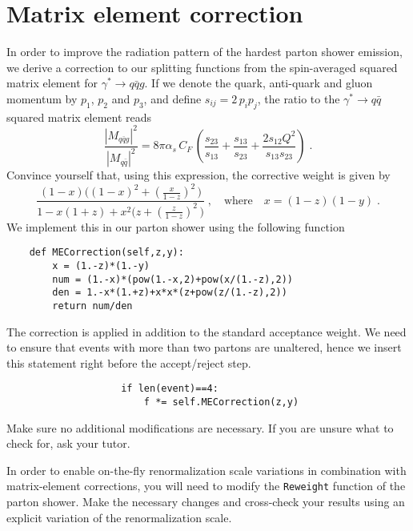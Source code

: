\documentclass[10pt,fleqn]{scrartcl}
\begin{document}
\section{Matrix element correction}
In order to improve the radiation pattern of the hardest parton shower emission,
we derive a correction to our splitting functions from the spin-averaged squared
matrix element for $\gamma^*\to q\bar{q}g$. If we denote the quark, anti-quark
and gluon momentum by $p_1$, $p_2$ and $p_3$, and define $s_{ij}=2\,p_ip_j$,
the ratio to the $\gamma^*\to q\bar{q}$ squared matrix element reads
\begin{equation}\label{eq:ee3jme}
  \frac{|M_{q\bar{q}g}|^2}{|M_{q\bar{q}}|^2}=
  8\pi\alpha_s\,C_F\,\left(\frac{s_{23}}{s_{13}}+\frac{s_{13}}{s_{23}}
  +\frac{2s_{12}Q^2}{s_{13}s_{23}}\right)\;.
\end{equation} 
Convince yourself that, using this expression, the corrective weight is given by
\begin{equation}
  \frac{(1-x)\Bigg((1-x)^2+\left(\displaystyle\frac{x}{1-z}\right)^2\,\Bigg)}{
    1-x(1+z)+x^2\Bigg(z+\left(\displaystyle\frac{z}{1-z}\right)^2\,\Bigg)}\;,
  \quad\text{where}\quad
  x=(1-z)(1-y)\;.
\end{equation}
We implement this in our parton shower using the following function
\begin{verbatim}
    def MECorrection(self,z,y):
        x = (1.-z)*(1.-y)
        num = (1.-x)*(pow(1.-x,2)+pow(x/(1.-z),2))
        den = 1.-x*(1.+z)+x*x*(z+pow(z/(1.-z),2))
        return num/den
\end{verbatim}
The correction is applied in addition to the standard acceptance weight.
We need to ensure that events with more than two partons are unaltered,
hence we insert this statement right before the accept/reject step.
\begin{verbatim}
                    if len(event)==4:
                        f *= self.MECorrection(z,y) 
\end{verbatim}
Make sure no additional modifications are necessary.
If you are unsure what to check for, ask your tutor.

In order to enable on-the-fly renormalization scale variations
in combination with matrix-element corrections, you will need 
to modify the {\tt Reweight} function of the parton shower.
Make the necessary changes and cross-check your results using
an explicit variation of the renormalization scale.
\end{document}
